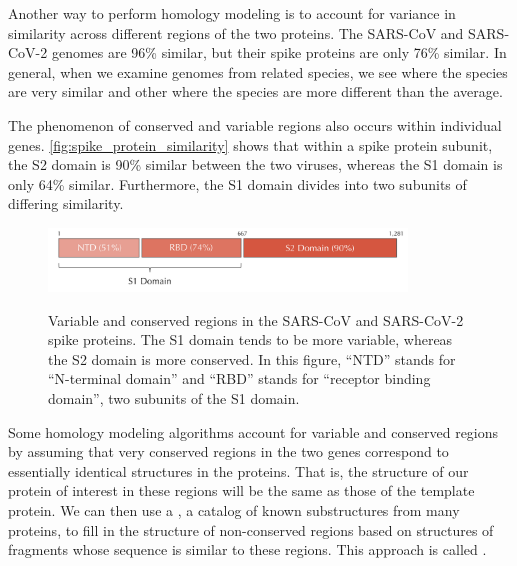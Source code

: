 Another way to perform homology modeling is to account for variance in similarity across different regions of the two proteins. The SARS-CoV and SARS-CoV-2 genomes are 96\% similar, but their spike proteins are only 76\% similar. In general, when we examine genomes from related species, we see  where the species are very similar and other  where the species are more different than the average.

The phenomenon of conserved and variable regions also occurs within individual genes. \autoref{fig:spike_protein_similarity} shows that within a spike protein subunit, the S2 domain is 90\% similar between the two viruses, whereas the S1 domain is only 64\% similar. Furthermore, the S1 domain divides into two subunits of differing similarity.

\begin{figure}[h]
	\centering
	\mySfFamily
	\includegraphics[width = 0.85\textwidth]{../images/spike_protein_similarity.png}\\
	\caption{Variable and conserved regions in the SARS-CoV and SARS-CoV-2 spike proteins. The S1 domain tends to be more variable, whereas the S2 domain is more conserved. In this figure, ``NTD'' stands for ``N-terminal domain'' and ``RBD'' stands for ``receptor binding domain'', two subunits of the S1 domain.}
	\label{fig:spike_protein_similarity}
\end{figure}

Some homology modeling algorithms account for variable and conserved regions by assuming that very conserved regions in the two genes correspond to essentially identical structures in the proteins. That is, the structure of our protein of interest in these regions will be the same as those of the template protein. We can then use a , a catalog of known substructures from many proteins, to fill in the structure of non-conserved regions based on structures of fragments whose sequence is similar to these regions. This approach is called .

